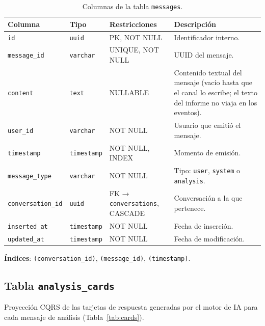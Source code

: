 \begin{table}[H]
\centering
\footnotesize
\caption{Columnas de la tabla \texttt{messages}.}
\label{tab:messages}
\begin{tabular}{llP{3.2cm}P{4.5cm}}
\hline
\textbf{Columna} & \textbf{Tipo} & \textbf{Restricciones} & \textbf{Descripción} \\
\hline
\texttt{id}               & \texttt{uuid}        & PK, NOT NULL   & Identificador interno. \\
\texttt{message\_id}      & \texttt{varchar}     & UNIQUE, NOT NULL & UUID del mensaje. \\
\texttt{content}          & \texttt{text}        & NULLABLE       & Contenido textual del mensaje (vacío hasta que el canal lo escribe; el texto del informe no viaja en los eventos). \\
\texttt{user\_id}         & \texttt{varchar}     & NOT NULL       & Usuario que emitió el mensaje. \\
\texttt{timestamp}        & \texttt{timestamp} & NOT NULL, INDEX & Momento de emisión. \\
\texttt{message\_type}    & \texttt{varchar}     & NOT NULL       & Tipo: \texttt{user}, \texttt{system} o \texttt{analysis}. \\
\texttt{conversation\_id} & \texttt{uuid}        & FK → \texttt{conversations}, CASCADE & Conversación a la que pertenece. \\
\texttt{inserted\_at}     & \texttt{timestamp} & NOT NULL       & Fecha de inserción. \\
\texttt{updated\_at}      & \texttt{timestamp} & NOT NULL       & Fecha de modificación. \\
\hline
\end{tabular}
\end{table}

\textbf{Índices}: \texttt{(conversation\_id)}, \texttt{(message\_id)}, \texttt{(timestamp)}.

\subsection{Tabla \texttt{analysis\_cards}}

Proyección CQRS de las tarjetas de respuesta generadas por el motor de IA para cada mensaje de análisis (Tabla~\ref{tab:cards}).


